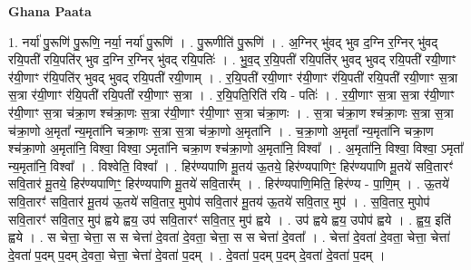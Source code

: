 \documentclass[17pt]{extarticle}
\begin{document}
\textbf{Ghana Paata } \newline

1. नर्या॑ पु॒रूणि॑ पु॒रूणि॒ नर्या॒ नर्या॑ पु॒रूणि॑ । . पु॒रूणीति॑ पु॒रूणि॑ । . अ॒ग्निर् भु॑वद् भुव द॒ग्नि र॒ग्निर् भु॑वद् रयि॒पती॑ रयि॒पति॑र् भुव द॒ग्नि र॒ग्निर् भु॑वद् रयि॒पतिः॑ । . भु॒व॒द् र॒यि॒पती॑ रयि॒पति॑र् भुवद् भुवद् रयि॒पती॑ रयी॒णाꣳ र॑यी॒णाꣳ र॑यि॒पति॑र् भुवद् भुवद् रयि॒पती॑ रयी॒णाम् । . र॒यि॒पती॑ रयी॒णाꣳ र॑यी॒णाꣳ र॑यि॒पती॑ रयि॒पती॑ रयी॒णाꣳ स॒त्रा स॒त्रा र॑यी॒णाꣳ र॑यि॒पती॑ रयि॒पती॑ रयी॒णाꣳ स॒त्रा । . र॒यि॒पति॒रिति॑ रयि - पतिः॑ । . र॒यी॒णाꣳ स॒त्रा स॒त्रा र॑यी॒णाꣳ र॑यी॒णाꣳ स॒त्रा च॑क्रा॒ण श्च॑क्रा॒णः स॒त्रा र॑यी॒णाꣳ र॑यी॒णाꣳ स॒त्रा च॑क्रा॒णः । . स॒त्रा च॑क्रा॒ण श्च॑क्रा॒णः स॒त्रा स॒त्रा च॑क्रा॒णो अ॒मृता᳚ न्य॒मृता॑नि चक्रा॒णः स॒त्रा स॒त्रा च॑क्रा॒णो अ॒मृता॑नि । . च॒क्रा॒णो अ॒मृता᳚ न्य॒मृता॑नि चक्रा॒ण श्च॑क्रा॒णो अ॒मृता॑नि॒ विश्वा॒ विश्वा॒ ऽमृता॑नि चक्रा॒ण श्च॑क्रा॒णो अ॒मृता॑नि॒ विश्वा᳚ । . अ॒मृता॑नि॒ विश्वा॒ विश्वा॒ ऽमृता᳚ न्य॒मृता॑नि॒ विश्वा᳚ । . विश्वेति॒ विश्वा᳚ । . हिर॑ण्यपाणि मू॒तय॑ ऊ॒तये॒ हिर॑ण्यपाणिꣳ॒॒ हिर॑ण्यपाणि मू॒तये॑ सवि॒तारꣳ॑ सवि॒तार॑ मू॒तये॒ हिर॑ण्यपाणिꣳ॒॒ हिर॑ण्यपाणि मू॒तये॑ सवि॒तार᳚म् । . हिर॑ण्यपाणि॒मिति॒ हिर॑ण्य - पा॒णि॒म् । . ऊ॒तये॑ सवि॒तारꣳ॑ सवि॒तार॑ मू॒तय॑ ऊ॒तये॑ सवि॒तार॒ मुपोप॑ सवि॒तार॑ मू॒तय॑ ऊ॒तये॑ सवि॒तार॒ मुप॑ । . स॒वि॒तार॒ मुपोप॑ सवि॒तारꣳ॑ सवि॒तार॒ मुप॑ ह्वये ह्वय॒ उप॑ सवि॒तारꣳ॑ सवि॒तार॒ मुप॑ ह्वये । . उप॑ ह्वये ह्वय॒ उपोप॑ ह्वये । . ह्व॒य॒ इति॑ ह्वये । . स चेत्ता॒ चेत्ता॒ स स चेत्ता॑ दे॒वता॑ दे॒वता॒ चेत्ता॒ स स चेत्ता॑ दे॒वता᳚ । . चेत्ता॑ दे॒वता॑ दे॒वता॒ चेत्ता॒ चेत्ता॑ दे॒वता॑ प॒दम् प॒दम् दे॒वता॒ चेत्ता॒ चेत्ता॑ दे॒वता॑ प॒दम् । . दे॒वता॑ प॒दम् प॒दम् दे॒वता॑ दे॒वता॑ प॒दम् । \newline
\end{document}
